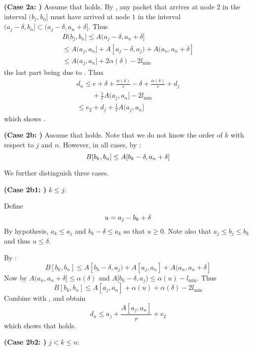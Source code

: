 \textbf{(Case 2a: )} Assume that 
holds. By , any packet that arrives at node
2 in the interval $(b_j,b_n]$ must have arrived at node $1$ in
the interval $(a_j - \delta, b_n] \subset (a_j - \delta,
a_n+\delta]$. Thus
$$
  \begin{array}{l}
    B(b_j,b_n] \leq A(a_j - \delta, a_n+\delta] \\
     \leq A(a_j,a_n] + A[a_j -\delta, a_j)+
    A(a_n, a_n + \delta]\\
    \leq
A(a_j,a_n]+ 2 \alpha(\delta) -2 l_{\min}
  \end{array}
$$
the last part being due to . Thus
$$
\begin{array}{l}
 d_n \leq e + \delta + \frac{\alpha(\delta)}{r}- \delta +
  \frac{\alpha(\delta)}{r} +
 d_j \\
  \;\; \;\; \;\; \;\;+ \frac{1}{r} A(a_j,a_n] -2 l_{\min} \\
 \leq e_2 +
 d_j + \frac{1}{r} A(a_j,a_n]
 \end{array}
$$
which shows .

\textbf{(Case 2b: )} Assume that 
holds. Note that we do not know the order of $k$ with respect
to $j$ and $n$. However, in all cases, by :
\begin{equation}\mylabel{eq-dsakl8236}
  B[b_k, b_n] \leq A[b_k-\delta, a_n + \delta]
\end{equation}

We further distinguish three cases.

\textbf{(Case 2b1: )}   $ k \leq j $:

Define
\begin{equation}\mylabel{eq-defuaiw8927}
  u=  a_j -b_k +\delta
\end{equation}
By hypothesis, $a_k\leq a_j$ and $b_k -\delta \leq  a_k$ so
that $u \geq 0$. Note also that $a_j\leq b_j
 \leq b_k$ and thus $u \leq \delta$.

 By :
 $$
B[b_k, b_n] \leq A[b_k - \delta, a_j) + A[a_j, a_n] + A(a_n,
a_n + \delta ]
 $$
 Now by
 $A(a_n, a_n + \delta ] \leq \alpha(\delta)$
and $A[b_k - \delta, a_j) \leq \alpha(u)- l_{\min}$. Thus
$$
B[b_k, b_n] \leq A[a_j, a_n]+ \alpha(u) + \alpha(\delta) - 2
l_{\min}
$$
Combine with , 
and obtain
$$
d_n  \leq a_j + \frac{A[a_j, a_n]}{r} + e_2
$$
which shows that  holds.

\textbf{(Case 2b2: )} $j < k  \leq n$:


